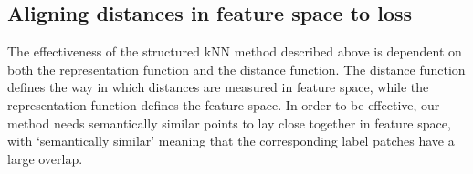 
\subsection{Aligning distances in feature space to loss}

The effectiveness of the structured \ac{kNN} method described above is dependent on both the representation function and the distance function. The  distance function defines the way in which distances are measured in feature space, while the representation function defines the feature space. In order to be effective, our method needs semantically similar points to lay close together in feature space, with `semantically similar' meaning that the corresponding label patches have a large overlap.

